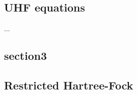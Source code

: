 \documentclass[norsk,a4paper,12pt]{article}
\begin{document}
\subsection{UHF equations}
...

\subsection{section3}
\subsection{Restricted Hartree-Fock}


\end{document}
